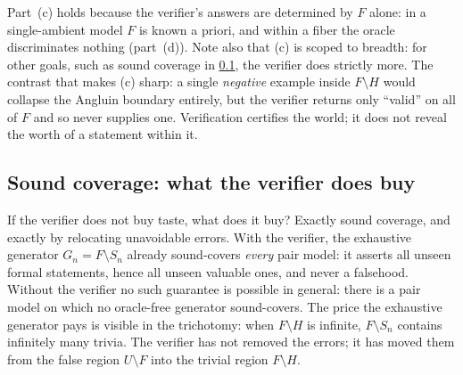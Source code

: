 \documentclass[11pt]{article}
\numberwithin{equation}{section}
\newcommand{\gnd}{U}
\newcommand{\Amb}{F}
\newcommand{\Val}{H}
\newcommand{\Seen}{S}
\theoremstyle{plain}
\theoremstyle{definition}
\theoremstyle{remark}
\begin{document}
Part~(c) holds because the verifier's answers are determined by $\Amb$ alone: in a
single-ambient model $\Amb$ is known a priori, and within a fiber the oracle discriminates
nothing (part~(d)). Note also that (c) is scoped to breadth: for other goals, such as sound
coverage in \cref{sec:res-flood}, the verifier does strictly more. The contrast that makes (c)
sharp: a single \emph{negative} example inside $\Amb \setminus \Val$ would collapse the
Angluin boundary entirely, but the verifier returns only ``valid'' on all of $\Amb$ and so
never supplies one. Verification certifies the world; it does not reveal the worth of a
statement within it.

\subsection{Sound coverage: what the verifier does buy}
\label{sec:res-flood}

If the verifier does not buy taste, what does it buy? Exactly sound coverage, and exactly by
relocating unavoidable errors. With the verifier, the exhaustive generator $G_n = \Amb
\setminus \Seen_n$ already sound-covers \emph{every} pair model: it asserts all unseen formal
statements, hence all unseen valuable ones, and never a falsehood. Without the verifier no
such guarantee is possible in general: there is a pair model on which no oracle-free generator
sound-covers. The price the exhaustive generator pays is visible in the trichotomy: when $\Amb
\setminus \Val$ is infinite, $\Amb \setminus \Seen_n$ contains infinitely many trivia. The
verifier has not removed the errors; it has moved them from the false region $\gnd \setminus
\Amb$ into the trivial region $\Amb \setminus \Val$.
\end{document}
